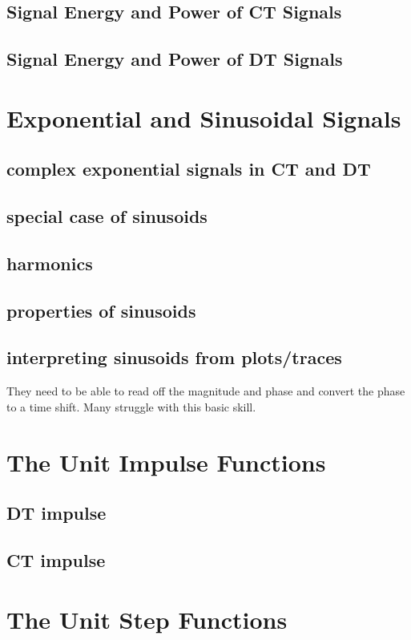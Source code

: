 \documentclass{article}
\begin{document}
\subsection{Signal Energy and Power of CT Signals}
\label{sec:org177586b}
\subsection{Signal Energy and Power of DT Signals}
\label{sec:orgc0bedd6}
\section{Exponential and Sinusoidal Signals}
\label{sec:orge17b3c1}
\subsection{complex exponential signals in CT and DT}
\label{sec:org9255270}
\subsection{special case of sinusoids}
\label{sec:orgecba192}
\subsection{harmonics}
\label{sec:org5e8d9ab}
\subsection{properties of sinusoids}
\label{sec:orga96306e}
\subsection{interpreting sinusoids from plots/traces}
\label{sec:org53b2fa0}
They need to be able to read off the magnitude and phase and convert the phase to a time shift. Many struggle with this basic skill.
\section{The Unit Impulse Functions}
\label{sec:org33257b0}
\subsection{DT impulse}
\label{sec:org1210e0d}
\subsection{CT impulse}
\label{sec:org5a0b8cc}
\section{The Unit Step Functions}
\label{sec:orgcd386ae}
\end{document}
